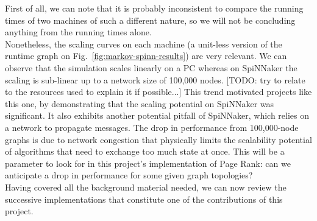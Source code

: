 First of all, we can note that it is probably inconsistent to compare the running times of two machines of such a different nature, so we will not be concluding anything from the running times alone. \\

Nonetheless, the scaling curves on each machine (a unit-less version of the runtime graph on Fig.~\ref{fig:markov-spinn-results}) are very relevant. We can observe that the simulation scales linearly on a PC whereas on SpiNNaker the scaling is sub-linear up to a network size of 100,000 nodes. [TODO: try to relate to the resources used to explain it if possible...] This trend motivated projects like this one, by demonstrating that the scaling potential on SpiNNaker was significant. It also exhibits another potential pitfall of SpiNNaker, which relies on a network to propagate messages. The drop in performance from 100,000-node graphs is due to network congestion that physically limits the scalability potential of algorithms that need to exchange too much state at once. This will be a parameter to look for in this project's implementation of Page Rank: can we anticipate a drop in performance for some given graph topologies? \\

\vspace*{-0.1cm}
Having covered all the background material needed, we can now review the successive implementations that constitute one of the contributions of this project.


